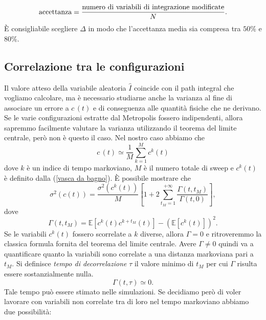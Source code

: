 \documentclass{article}
\begin{document}
\begin{equation}
    \label{accettanza}
    \textup{accettanza}=\frac{\textup{numero di variabili di integrazione modificate}}{N}.
\end{equation}
È consigliabile scegliere $\Delta$ in modo che l'accettanza media sia compresa tra $50\%$ e $80\%$. 



\subsection{Correlazione tra le configurazioni}

Il valore atteso della variabile aleatoria $\hat{I}$ coincide con il path integral che vogliamo calcolare, ma è necessario studiarne anche la varianza al fine di associare un errore a $c\,(t)$ e di conseguenza alle quantità fisiche che ne derivano. \\ Se le varie configurazioni estratte dal Metropolis fossero indipendenti, allora sapremmo facilmente valutare la varianza utilizzando il teorema del limite centrale, però non è questo il caso. Nel nostro caso abbiamo che 
\begin{equation}
    c\,(t)\simeq \frac{1}{M}\sum_{k=1}^{M}c^k(t)
\end{equation}
dove $k$ è un indice di tempo markoviano, $M$ è il numero totale di sweep e $c^k(t)$ è definito dalla (\ref{vasca da bagno}). È possibile mostrare che 
\begin{equation}
    \sigma^2(c(t))=\frac{\sigma^2(c^k(t))}{M}\left[1+2\sum_{t_M=1}^{+\infty}\frac{\Gamma(t,t_M)}{\Gamma(t,0)}\right],
\end{equation}
dove 
\begin{equation}
    \label{equazione gamma}
    \Gamma(t, t_M)=\mathbb{E}[c^k(t)c^{k+t_M}(t)]-\left(\mathbb{E}[c^k(t)]\right)^2.
\end{equation}
Se le variabili $c^k(t)$ fossero scorrelate a $k$ diverse, allora $\Gamma=0$ e ritroveremmo la classica formula fornita del teorema del limite centrale. Avere $\Gamma\neq0$ quindi va a quantificare quanto la variabili sono correlate a una distanza markoviana pari a $t_M$. Si definisce \textit{tempo di decorrelazione} $\tau$ il valore minimo di $t_M$ per cui $\Gamma$ risulta essere sostanzialmente nulla. 
\begin{equation}
    \Gamma(t,\tau)\simeq 0.
\end{equation}
Tale tempo può essere stimato nelle simulazioni. Se decidiamo però di voler lavorare con variabili non correlate tra di loro nel tempo markoviano abbiamo due possibilità:
\end{document}
